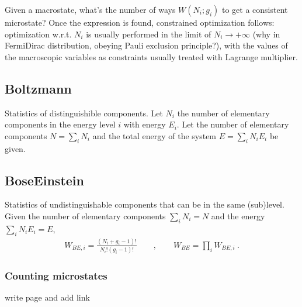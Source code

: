 \documentclass[letterpaper,10pt,english]{jupyterBook}
\begin{document}
\sphinxAtStartPar
Given a macrostate, what’s the number of ways \(W(N_i; g_i)\) to get a consistent microstate? Once the expression is found, constrained optimization follows: optimization w.r.t. \(N_i\) is usually performed in the limit of \(N_i \rightarrow +\infty\) (why in Fermi\sphinxhyphen{}Dirac distribution, obeying Pauli exclusion principle?), with the values of the macroscopic variables as constraints usually treated with Lagrange multiplier.


\subsection{Boltzmann}
\label{\detokenize{ch/statistical-mechanics/notes:boltzmann}}\label{\detokenize{ch/statistical-mechanics/notes:statistical-mechanics-notes-distributions-b}}
\sphinxAtStartPar
Statistics of distinguishible components. Let \(N_i\) the number of elementary components in the energy level \(i\) with energy \(E_i\). Let the number of elementary components \(N = \sum_i N_i\) and the total energy of the system \(E = \sum_i N_i E_i\) be given.


\subsection{Bose\sphinxhyphen{}Einstein}
\label{\detokenize{ch/statistical-mechanics/notes:bose-einstein}}\label{\detokenize{ch/statistical-mechanics/notes:statistical-mechanics-notes-distributions-be}}
\sphinxAtStartPar
Statistics of undistinguishable components that can be in the same (sub)level.
Given the number of elementary components \(\sum_{i} N_i = N\) and the energy \(\sum_{i} N_i E_i = E\),
\begin{equation}\label{equation:ch/statistical-mechanics/notes:eq:be}
\begin{split}W_{BE,i} = \frac{(N_i + g_i - 1)!}{N_i! (g_i-1)!} \qquad , \qquad W_{BE} = \prod_i W_{BE,i} \ .\end{split}
\end{equation}\subsubsection*{Counting microstates}

\sphinxAtStartPar
{} write page  and add link
\end{document}
